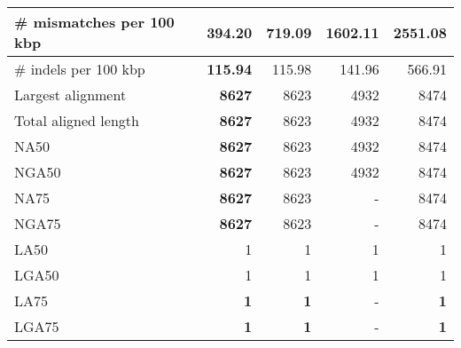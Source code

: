 \documentclass[12pt,a4paper]{article}
\begin{document}
\begin{table}[ht]
\begin{center}
\begin{tabular}{|l*{4}{|r}|}
\# mismatches per 100 kbp & {\bf 394.20} & 719.09 & 1602.11 & 2551.08 \\ \hline
\# indels per 100 kbp & {\bf 115.94} & 115.98 & 141.96 & 566.91 \\ \hline
Largest alignment & {\bf 8627} & 8623 & 4932 & 8474 \\ \hline
Total aligned length & {\bf 8627} & 8623 & 4932 & 8474 \\ \hline
NA50 & {\bf 8627} & 8623 & 4932 & 8474 \\ \hline
NGA50 & {\bf 8627} & 8623 & 4932 & 8474 \\ \hline
NA75 & {\bf 8627} & 8623 & - & 8474 \\ \hline
NGA75 & {\bf 8627} & 8623 & - & 8474 \\ \hline
LA50 & 1 & 1 & 1 & 1 \\ \hline
LGA50 & 1 & 1 & 1 & 1 \\ \hline
LA75 & {\bf 1} & {\bf 1} & - & {\bf 1} \\ \hline
LGA75 & {\bf 1} & {\bf 1} & - & {\bf 1} \\ \hline
\end{tabular}
\end{center}
\end{table}
\end{document}

